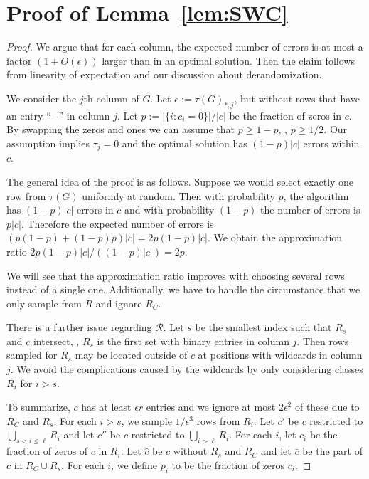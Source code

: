 \section{Proof of Lemma~\ref{lem:SWC}}\label{app:SWC}
\begin{proof}
We argue that for each column, the expected number of errors is at most a factor $(1 + O(\epsilon))$ larger than in an optimal solution.
Then the claim follows from linearity of expectation and our discussion about derandomization.

We consider the $j$th column of $G$.
Let $c := \tau(G)_{*,j}$, but without rows that have an entry ``$-$'' in column $j$.
Let $p := |\{ i : c_i = 0\}|/|c|$ be the fraction of zeros in $c$.
By swapping the zeros and ones we can assume \WLOG that $p \ge 1-p$, \ie, $p \ge 1/2$.
Our assumption implies $\tau_j = 0$ and the optimal solution has $(1-p)|c|$ errors within $c$.

The general idea of the proof is as follows.
Suppose we would select exactly one row from $\tau(G)$ uniformly at random.
Then with probability $p$, the algorithm has $(1-p)|c|$ errors in $c$ and with probability $(1-p)$ the number of errors is $p|c|$.
Therefore the expected number of errors is $(p(1-p) + (1-p)p) |c| = 2 p (1-p) |c|$.
We obtain the approximation ratio $2 p (1-p) |c| / ((1-p)|c|) = 2 p$.

We will see that the approximation ratio improves with choosing several rows instead of a single one.
Additionally, we have to handle the circumstance that we only sample from $R$ and ignore $R_C$.

There is a further issue regarding $\mathcal{R}$.
Let $s$ be the smallest index such that $R_s$ and $c$ intersect, \ie, $R_s$ is the first set with binary entries in column $j$.
Then rows sampled for $R_s$ may be located outside of $c$ at positions with wildcards in column $j$.
We avoid the complications caused by the wildcards by only considering classes $R_{i}$ for $i > s$.

To summarize, $c$ has at least $\epsilon r$ entries and we ignore at most $2 \epsilon^2$ of these due to $R_C$ and $R_s$.
For each $i > s$, we sample $1/\epsilon^3$ rows from $R_i$. 
Let $c'$ be $c$ restricted to $\bigcup_{s < i \le \ell} R_{i}$ and let $c''$ be $c$ restricted to $\bigcup_{i> \ell} R_{i}$.
For each $i$, let $c_i$ be the fraction of zeros of $c$ in $R_i$.
Let $\hat{c}$ be $c$ without $R_s$ and $R_C$ and let $\bar{c}$ be the part of $c$ in $R_C \cup R_s$.
For each $i$, we define $p_i$ to be the fraction of zeros $c_i$.


\end{proof}
